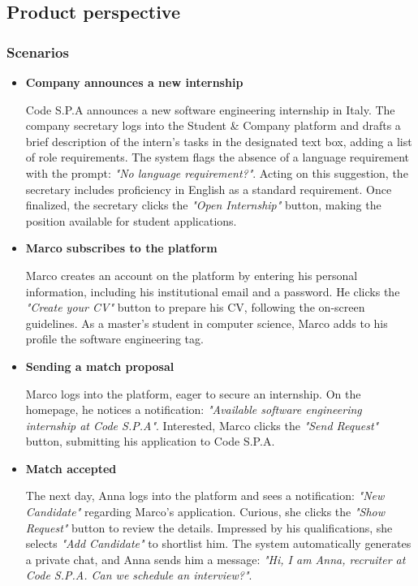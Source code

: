 \subsection{Product perspective}
\subsubsection{Scenarios}

\begin{itemize}
    \item \textbf{Company announces a new internship}
         
          Code S.P.A announces a new software engineering internship in Italy.  
          The company secretary logs into the Student \& Company platform and drafts a brief description of the intern's tasks in the designated text box, adding a list of role requirements.  
          The system flags the absence of a language requirement with the prompt: \textit{"No language requirement?"}.  
          Acting on this suggestion, the secretary includes proficiency in English as a standard requirement.  
          Once finalized, the secretary clicks the \textit{"Open Internship"} button, making the position available for student applications.

    \item\textbf{ Marco subscribes to the platform  }

          Marco creates an account on the platform by entering his personal information, including his institutional email and a password.  
          He clicks the \textit{"Create your CV"} button to prepare his CV, following the on-screen guidelines.  
          As a master's student in computer science, Marco adds to his profile the software engineering tag.

    \item\textbf{ Sending a match proposal  }
    
          Marco logs into the platform, eager to secure an internship.  
          On the homepage, he notices a notification: \textit{"Available software engineering internship at Code S.P.A"}.  
          Interested, Marco clicks the \textit{"Send Request"} button, submitting his application to Code S.P.A.

    \item\textbf{ Match accepted  }

          The next day, Anna logs into the platform and sees a notification: \textit{"New Candidate"} regarding Marco's application.  
          Curious, she clicks the \textit{"Show Request"} button to review the details.  
          Impressed by his qualifications, she selects \textit{"Add Candidate"} to shortlist him.  
          The system automatically generates a private chat, and Anna sends him a message: \textit{"Hi, I am Anna, recruiter at Code S.P.A. Can we schedule an interview?"}.


\end{itemize}
